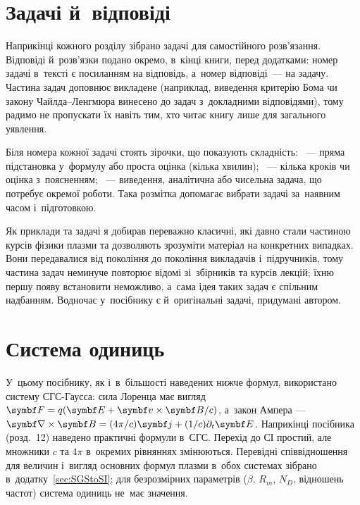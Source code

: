 \section*{Задачі й~відповіді}

Наприкінці кожного розділу зібрано задачі для самостійного розв'язання. Відповіді й~розв'язки подано
окремо, в~кінці книги, перед додатками: номер задачі в~тексті є посиланням на відповідь, а~номер відповіді~---
на задачу. Частина задач доповнює викладене (наприклад, виведення критерію Бома чи закону Чайлда--Ленгмюра
винесено до задач з~докладними відповідями), тому радимо не пропускати їх навіть тим, хто читає
книгу лише для загального уявлення.

Біля номера кожної задачі стоять зірочки, що показують складність: \unskip~---
пряма підстановка у~формулу або проста оцінка (кілька хвилин); \unskip~--- кілька
кроків чи оцінка з~поясненням; \unskip~--- виведення, аналітична або чисельна задача, що
потребує окремої роботи. Така розмітка допомагає вибрати задачі за~наявним часом і~підготовкою.

Як приклади та задачі я добирав переважно класичні, які давно стали частиною курсів фізики плазми та
дозволяють зрозуміти матеріал на конкретних випадках. Вони передавалися від покоління до покоління
викладачів і~підручників, тому частина задач неминуче повторює відомі зі~збірників та курсів лекцій;
їхню першу появу встановити неможливо, а~сама ідея таких задач є спільним надбанням. Водночас у~посібнику
є й~оригінальні задачі, придумані автором.

\section*{Система одиниць}

У~цьому посібнику, як і~в~більшості наведених нижче формул, використано систему СГС-Гаусса:
сила Лоренца має вигляд $\vect F=q(\vect E+\vect v\times\vect B/c)$, а~закон Ампера ---
$\rot\vect B=(4\pi/c)\vect j+(1/c)\partial_t\vect E$. Наприкінці посібника (розд.~12)
наведено практичні формули в~СГС. Перехід до СІ простий, але множники $c$ та $4\pi$ в~окремих
рівняннях змінюються. Перевідні співвідношення для величин і~вигляд основних формул плазми в~обох системах
зібрано в~додатку~\ref{sec:SGStoSI}; для безрозмірних параметрів ($\beta$, $R_m$, $N_D$, відношень частот)
система одиниць не~має значення.


